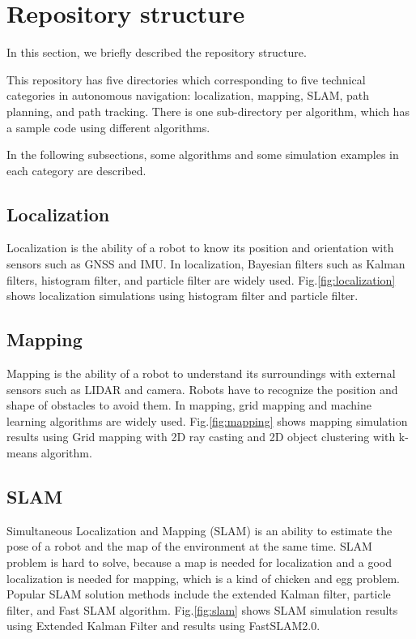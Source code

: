 \documentclass{bmvc2k}
\begin{document}
\section{Repository structure}

In this section, we briefly described the repository structure.

This repository has five directories which corresponding to five technical categories in autonomous navigation: localization, mapping, SLAM, path planning, and path tracking.
There is one sub-directory per algorithm, which has a sample code using different algorithms.

In the following subsections, some algorithms and some simulation examples in each category are described.

\subsection{Localization}

Localization is the ability of a robot to know its position and orientation with sensors such as GNSS and IMU.
In localization, Bayesian filters such as Kalman filters, histogram filter, and particle filter are widely used\cite{PR}.
Fig.\ref{fig:localization} shows localization simulations using histogram filter and particle filter.



\subsection{Mapping}
Mapping is the ability of a robot to understand its surroundings with external sensors such as LIDAR and camera.
Robots have to recognize the position and shape of obstacles to avoid them.
In mapping, grid mapping and machine learning algorithms are widely used\cite{PR}\cite{PRML}.
Fig.\ref{fig:mapping} shows mapping simulation results using Grid mapping with 2D ray casting and 2D object clustering with k-means algorithm.



\subsection{SLAM}
Simultaneous Localization and Mapping (SLAM) is an ability to estimate the pose of a robot and the map of the environment at the same time.
SLAM problem is hard to solve, because a map is needed for localization and a good localization is needed for mapping, which is a kind of chicken and egg problem.
Popular SLAM solution methods include the extended Kalman filter, particle filter, and Fast SLAM algorithm\cite{PR}.
Fig.\ref{fig:slam} shows SLAM simulation results using Extended Kalman Filter and results using FastSLAM2.0\cite{PR}.
\end{document}
